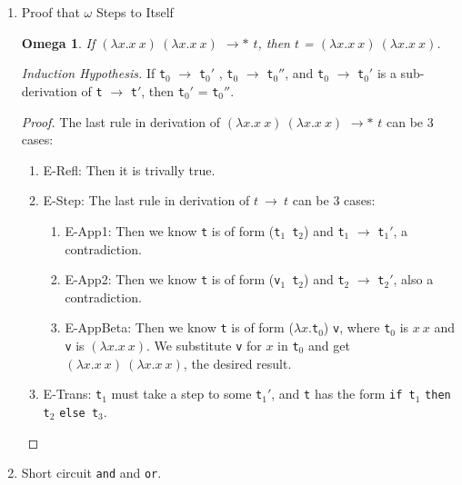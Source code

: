 \documentclass{article}
\newtheorem{omg}{Omega}
\begin{document}
\begin{enumerate}
  \item{Proof that $\omega$ Steps to Itself}
    \begin{omg}If $(\lambda x.x\ x)\ (\lambda x.x\ x)$ $\longrightarrow*$ $t$, then $t$ = $(\lambda x.x\ x)\ (\lambda x.x\ x)$.
    \end{omg}

    \textit{Induction Hypothesis.} If \verb|t|$_0$ $\longrightarrow$ \verb|t|$_0'$ , \verb|t|$_0$ $\longrightarrow$ \verb|t|$_0''$, and \verb|t|$_0$ $\longrightarrow$ \verb|t|$_0'$ is a sub-derivation of \verb|t| $\longrightarrow$ \verb|t|$'$, then \verb|t|$_0'$ = \verb|t|$_0''$.

    \begin{proof}
      The last rule in derivation of $(\lambda x.x\ x)\ (\lambda x.x\ x)$ $\longrightarrow*$ $t$ can be 3 cases:
      \begin{enumerate}
      \item E-Refl: Then it is trivally true.

      \item E-Step:
        The last rule in derivation of $t\ \longrightarrow\ t$ can be 3 cases:
        \begin{enumerate}
          \item E-App1: Then we know \verb|t| is of form (\verb|t|$_1$\ \verb|t|$_2$) and \verb|t|$_1$ $\longrightarrow$ \verb|t|$_1'$, a contradiction.
          \item E-App2: Then we know \verb|t| is of form (\verb|v|$_1$\ \verb|t|$_2$) and \verb|t|$_2$ $\longrightarrow$ \verb|t|$_2'$, also a contradiction.
          \item E-AppBeta: Then we know \verb|t| is of form ($\lambda x.$\verb|t|$_0$) \verb|v|, where \verb|t|$_0$ is $x\ x$ and \verb|v| is $(\lambda x.x\ x)$. We substitute \verb|v| for $x$ in \verb|t|$_0$ and get $(\lambda x.x\ x)\ (\lambda x.x\ x)$, the desired result.
        \end{enumerate}


      \item E-Trans: \verb|t|$_1$ must take a step to some \verb|t|$_1'$, and \verb|t| has the form
        \verb|if t|$_1$ \verb|then t|$_2$ \verb|else t|$_3$.


      \end{enumerate}
    \end{proof}

    \newpage

  \item Short circuit \verb|and| and \verb|or|.\\


\end{enumerate}
\end{document}
